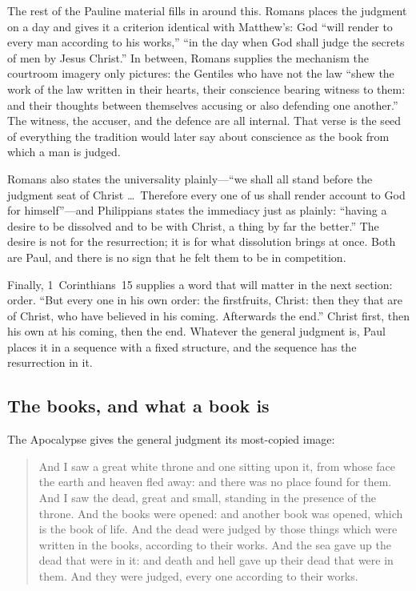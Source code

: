 The rest of the Pauline material fills in around this. Romans places the judgment on a day and gives it a criterion identical with Matthew's: God ``will render to every man according to his works,'' ``in the day when God shall judge the secrets of men by Jesus Christ.'' In between, Romans supplies the mechanism the courtroom imagery only pictures: the Gentiles who have not the law ``shew the work of the law written in their hearts, their conscience bearing witness to them: and their thoughts between themselves accusing or also defending one another.'' The witness, the accuser, and the defence are all internal. That verse is the seed of everything the tradition would later say about conscience as the book from which a man is judged.

Romans also states the universality plainly---``we shall all stand before the judgment seat of Christ \ldots\ Therefore every one of us shall render account to God for himself''---and Philippians states the immediacy just as plainly: ``having a desire to be dissolved and to be with Christ, a thing by far the better.'' The desire is not for the resurrection; it is for what dissolution brings at once. Both are Paul, and there is no sign that he felt them to be in competition.

Finally, 1~Corinthians~15 supplies a word that will matter in the next section: order. ``But every one in his own order: the firstfruits, Christ: then they that are of Christ, who have believed in his coming. Afterwards the end.'' Christ first, then his own at his coming, then the end. Whatever the general judgment is, Paul places it in a sequence with a fixed structure, and the sequence has the resurrection in it.

\subsection{The books, and what a book is}

The Apocalypse gives the general judgment its most-copied image:

\begin{quote}
And I saw a great white throne and one sitting upon it, from whose face the earth and heaven fled away: and there was no place found for them. And I saw the dead, great and small, standing in the presence of the throne. And the books were opened: and another book was opened, which is the book of life. And the dead were judged by those things which were written in the books, according to their works. And the sea gave up the dead that were in it: and death and hell gave up their dead that were in them. And they were judged, every one according to their works.
\end{quote}

